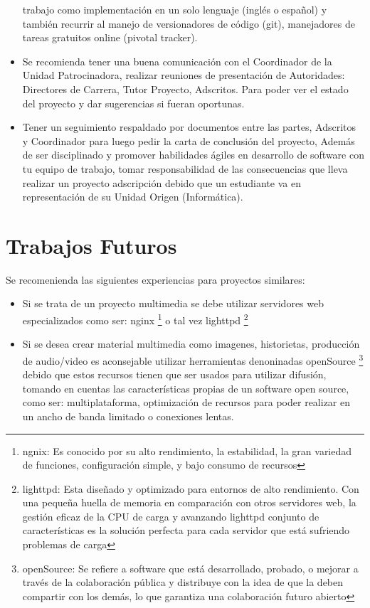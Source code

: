 \begin{itemize}
trabajo como implementaci\'{o}n en un solo lenguaje (ingl\'{e}s o espa\~{n}ol)
y tambi\'{e}n recurrir al manejo de versionadores de c\'{o}digo (git), 
manejadores de tareas gratuitos online (pivotal tracker).
\item Se recomienda tener una buena comunicaci\'{o}n con el Coordinador de la
Unidad Patrocinadora, realizar reuniones de presentaci\'{o}n
de Autoridades: Directores de Carrera, Tutor Proyecto, Adscritos. Para poder 
ver el estado del proyecto y dar sugerencias si fueran oportunas.
\item Tener un seguimiento respaldado por documentos entre las partes, Adscritos
y Coordinador para luego pedir la carta de conclusi\'{o}n del proyecto, Adem\'{a}s
de ser disciplinado y promover habilidades \'{a}giles en desarrollo de software con tu
equipo de trabajo, tomar responsabilidad de las consecuencias que lleva realizar un
proyecto adscripci\'{o}n debido que un estudiante va en representaci\'{o}n de su
Unidad Origen (Inform\'{a}tica).

\end{itemize}

\section{Trabajos Futuros}

Se recomenienda las siguientes experiencias para proyectos similares:

\begin{itemize}

\item Si se trata de un proyecto multimedia se debe utilizar servidores web 
especializados como ser: nginx \footnote{ngnix: Es conocido por su alto 
rendimiento, la estabilidad, la gran variedad de funciones, configuraci\'{o}n
simple, y bajo consumo de recursos} o tal vez lighttpd \footnote{lighttpd: 
Esta dise\~{n}ado y optimizado para entornos de alto rendimiento. Con una 
peque\~{n}a huella de memoria en comparaci\'{o}n con otros servidores web, la
gesti\'{o}n eficaz de la CPU de carga y avanzando lighttpd conjunto de 
caracter\'{i}sticas es la soluci\'{o}n perfecta para cada servidor que est\'{a}
sufriendo problemas de carga}
\item Si se desea crear material multimedia como imagenes, historietas, producci\'{o}n
de audio/video es aconsejable utilizar herramientas denoninadas openSource 
\footnote{openSource: Se refiere a software que est\'{a} desarrollado, probado,
o mejorar a trav\'{e}s de la colaboraci\'{o}n p\'{u}blica y distribuye con la
idea de que la deben compartir con los dem\'{a}s, lo que garantiza una 
colaboraci\'{o}n futuro abierto} debido que estos recursos tienen que ser usados
para utilizar difusi\'{o}n, tomando en cuentas las caracter\'{i}sticas propias 
de un software open source, como ser: multiplataforma, optimizaci\'{o}n de recursos
para poder realizar en un ancho de banda limitado o conexiones lentas. 
\end{itemize}